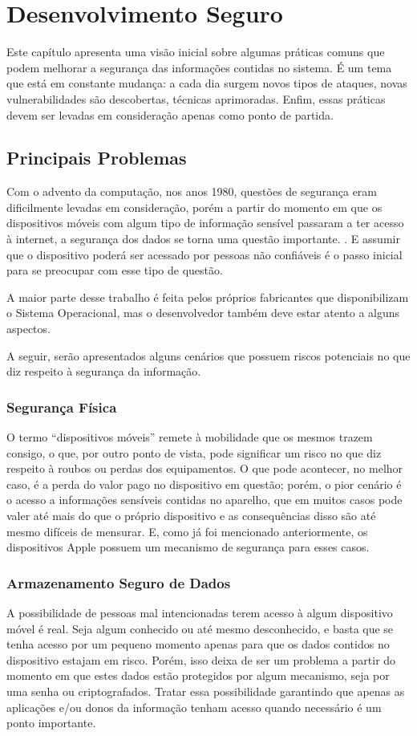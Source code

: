 \section{Desenvolvimento Seguro}
Este capítulo apresenta uma visão inicial sobre algumas práticas comuns que podem melhorar a segurança das informações contidas no sistema. É um tema que está em constante mudança: a cada dia surgem novos tipos de ataques, novas vulnerabilidades são descobertas, técnicas aprimoradas. Enfim, essas práticas devem ser levadas em consideração apenas como ponto de partida.

\subsection{Principais Problemas}
Com o advento da computação, nos anos 1980, questões de segurança eram dificilmente levadas em consideração, porém a partir do momento em que os dispositivos móveis com algum tipo de informação sensível passaram a ter acesso à internet, a segurança dos dados se torna uma questão importante. \cite{DWIVEDI}. E assumir que o dispositivo poderá ser acessado por pessoas não confiáveis é o passo inicial para se preocupar com esse tipo de questão. 

A maior parte desse trabalho é feita pelos próprios fabricantes que disponibilizam o Sistema Operacional, mas o desenvolvedor também deve estar atento a alguns aspectos. 

A seguir, serão apresentados alguns cenários que possuem riscos potenciais no que diz respeito à segurança da informação.

\subsubsection{Segurança Física}
O termo “dispositivos móveis” remete à mobilidade que os mesmos trazem consigo, o que, por outro ponto de vista, pode significar um risco no que diz respeito à roubos ou perdas dos equipamentos. O que pode acontecer, no melhor caso, é a perda do valor pago no dispositivo em questão; porém, o pior cenário é o acesso a informações sensíveis contidas no aparelho, que em muitos casos pode valer até mais do que o próprio dispositivo e as consequências disso são até mesmo difíceis de mensurar. \cite{DWIVEDI} E, como já foi mencionado anteriormente, os dispositivos Apple possuem um mecanismo de segurança para esses casos.

\subsubsection{ Armazenamento Seguro de Dados}
A possibilidade de pessoas mal intencionadas terem acesso à algum dispositivo móvel é real. Seja algum conhecido ou até mesmo desconhecido, e basta que se tenha acesso por um pequeno momento apenas para que os dados contidos no dispositivo estajam em risco. Porém, isso deixa de ser um problema a partir do momento em que estes dados estão protegidos por algum mecanismo, seja por uma senha ou criptografados. Tratar essa possibilidade garantindo que apenas as aplicações e/ou donos da informação tenham acesso quando necessário é um ponto importante. \cite{DWIVEDI}

